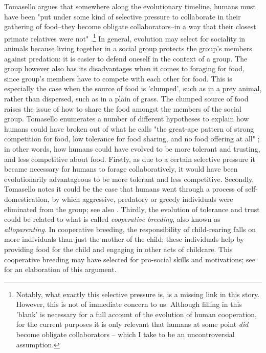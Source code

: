 Tomasello argues that somewhere along the evolutionary timeline, humans must have been "put under some kind of selective pressure to collaborate in their gathering of food--they become obligate collaborators--in a way that their closest primate relatives were not" \citep[p.~75]{Tomasello09}.\footnote{Notably, what exactly this selective pressure is, is a missing link in this story. However, this is not of immediate concern to us. Although filling in this 'blank' is necessary for a full account of the evolution of human cooperation, for the current purposes it is only relevant that humans at some point \emph{did} become obligate collaborators -- which I take to be an uncontroversial assumption.}
In general, evolution may select for sociality in animals because living together in a social group protects the group's members against predation: it is easier to defend oneself in the context of a group. The group however also has its disadvantages when it comes to foraging for food, since group's members have to compete with each other for food. This is especially the case when the source of food is 'clumped', such as in a prey animal, rather than dispersed, such as in a plain of grass. The clumped source of food raises the issue of how to share the food amongst the members of the social group.
Tomasello enumerates a number of different hypotheses to explain how humans could have broken out of what he calls "the great-ape pattern of strong competition for food, low tolerance for food sharing, and no food offering at all" \citep[p.~83]{Tomasello09}; in other words, how humans could have evolved to be more tolerant and trusting, and less competitive about food.
Firstly, as due to a certain selective pressure it became necessary for humans to forage collaboratively, it would have been evolutionarily advantageous to be more tolerant and less competitive.
Secondly, Tomasello notes it could be the case that humans went through a process of self-domestication, by which aggressive, predatory or greedy individuals were eliminated from the group; see also \citet{Hare17, Benitez21}.
Thirdly, the evolution of tolerance and trust could be related to what is called \emph{cooperative breeding}, also known as \emph{alloparenting}. In cooperative breeding, the responsibility of child-rearing falls on more individuals than just the mother of the child; these individuals help by providing food for the child and engaging in other acts of childcare. This cooperative breeding may have selected for pro-social skills and motivations; see \citet{Hrdy09} for an elaboration of this argument.

